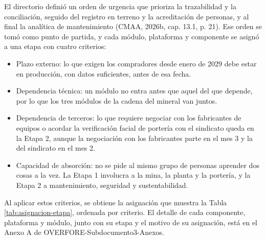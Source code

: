 \documentclass[subdoc]{../../comun/overfore}
\begin{document}
El directorio definió un orden de urgencia que prioriza la trazabilidad y la conciliación, seguido del registro en terreno y la acreditación de personas, y al final la analítica de mantenimiento (CMAA, 2026b, cap. 13.1, p. 21). Ese orden se tomó como punto de partida, y cada módulo, plataforma y componente se asignó a una etapa con cuatro criterios:

\begin{itemize}
\item Plazo externo: lo que exigen los compradores desde enero de 2029 debe estar en producción, con datos suficientes, antes de esa fecha.
\item Dependencia técnica: un módulo no entra antes que aquel del que depende, por lo que los tres módulos de la cadena del mineral van juntos.
\item Dependencia de terceros: lo que requiere negociar con los fabricantes de equipos o acordar la verificación facial de portería con el sindicato queda en la Etapa 2, aunque la negociación con los fabricantes parte en el mes 3 y la del sindicato en el mes 2.
\item Capacidad de absorción: no se pide al mismo grupo de personas aprender dos cosas a la vez. La Etapa 1 involucra a la mina, la planta y la portería, y la Etapa 2 a mantenimiento, seguridad y sustentabilidad.
\end{itemize}
Al aplicar estos criterios, se obtiene la asignación que muestra la Tabla \ref{tab:asignacion-etapa}, ordenada por criterio. El detalle de cada componente, plataforma y módulo, junto con su etapa y el motivo de su asignación, está en el Anexo A de OVERFORE-Subdocumento3-Anexos.
\end{document}
